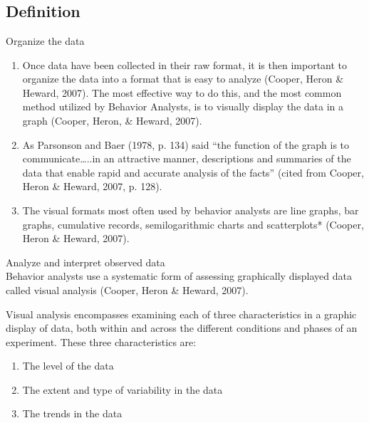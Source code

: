 \section{\fouriFive{}}
\subsection{Definition}
Organize the data
\begin{enumerate}
\item Once data have been collected in their raw format, it is then important to organize the data into a format that is easy to analyze (Cooper, Heron \& Heward, 2007). The most effective way to do this, and the most common method utilized by Behavior Analysts, is to visually display the data in a graph (Cooper, Heron, \& Heward, 2007).
\item As Parsonson and Baer (1978, p. 134) said ``the function of the graph is to communicate…..in an attractive manner, descriptions and summaries of the data that enable rapid and accurate analysis of the facts'' (cited from Cooper, Heron \& Heward, 2007, p. 128).
\item The visual formats most often used by behavior analysts are line graphs, bar graphs, cumulative records, semilogarithmic charts and scatterplots* (Cooper, Heron \& Heward, 2007).
\end{enumerate}
%
Analyze and interpret observed data\\

Behavior analysts use a systematic form of assessing graphically displayed data called visual analysis (Cooper, Heron \& Heward, 2007). 

Visual analysis encompasses examining each of three characteristics in a graphic display of data, both within and across the different conditions and phases of an experiment. These three characteristics are:

\begin{enumerate}
\item The level of the data
\item The extent and type of variability in the data 
\item The trends in the data
\end{enumerate}


